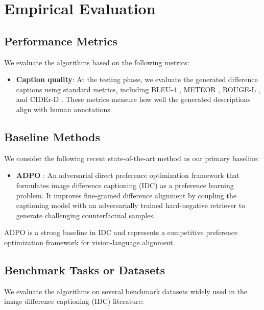
\section{Empirical Evaluation}

\subsection{Performance Metrics}
We evaluate the algorithms based on the following metrics:

\begin{itemize}
    \item \textbf{Caption quality}: At the testing phase, we evaluate the generated difference captions using standard metrics, including BLEU-4 \citep{papineni2002bleu}, METEOR \citep{banerjee2005meteor}, ROUGE-L \citep{lin2004rouge}, and CIDEr-D \citep{vedantam2015cider}. These metrics measure how well the generated descriptions align with human annotations.
\end{itemize}

\subsection{Baseline Methods}
We consider the following recent state-of-the-art method as our primary baseline:

\begin{itemize}
    \item \textbf{ADPO} \citep{huang2025image}: An adversarial direct preference optimization framework that formulates image difference captioning (IDC) as a preference learning problem. It improves fine-grained difference alignment by coupling the captioning model with an adversarially trained hard-negative retriever to generate challenging counterfactual samples.
\end{itemize}

ADPO is a strong baseline in IDC and represents a competitive preference optimization framework for vision-language alignment.

\subsection{Benchmark Tasks or Datasets}
We evaluate the algorithms on several benchmark datasets widely used in the image difference captioning (IDC) literature:

